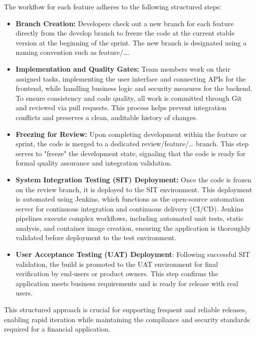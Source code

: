 \documentclass[12pt,oneside,openright,a4paper]{cpe-english-project}
\begin{document}
The workflow for each feature adheres to the following structured steps:

\begin{itemize}
\item
  \textbf{Branch Creation:} Developers check out a new branch for each
  feature directly from the develop branch to freeze the code at the
  current stable version at the beginning of the sprint. The new branch
  is designated using a naming convention such as feature/\ldots.
\item
  \textbf{Implementation and Quality Gates:} Team members work on their
  assigned tasks, implementing the user interface and connecting APIs
  for the frontend, while handling business logic and security measures
  for the backend. To ensure consistency and code quality, all work is
  committed through Git and reviewed via pull requests. This process
  helps prevent integration conflicts and preserves a clean, auditable
  history of changes.
\item
  \textbf{Freezing for Review:} Upon completing development within the
  feature or sprint, the code is merged to a dedicated
  review/feature/\ldots{} branch. This step serves to "freeze" the
  development state, signaling that the code is ready for formal quality
  assurance and integration validation.
\item
  \textbf{System Integration Testing (SIT) Deployment:} Once the code is
  frozen on the review branch, it is deployed to the SIT environment.
  This deployment is automated using Jenkins, which functions as the
  open-source automation server for continuous integration and
  continuous delivery (CI/CD). Jenkins pipelines execute complex
  workflows, including automated unit tests, static analysis, and
  container image creation, ensuring the application is thoroughly
  validated before deployment to the test environment.
\item
  \textbf{User Acceptance Testing (UAT) Deployment}: Following
  successful SIT validation, the build is promoted to the UAT
  environment for final verification by end-users or product owners.
  This step confirms the application meets business requirements and is
  ready for release with real users.
\end{itemize}

This structured approach is crucial for supporting frequent and reliable
releases, enabling rapid iteration while maintaining the compliance and
security standards required for a financial application.
\end{document}
